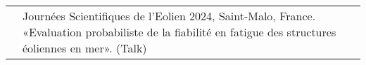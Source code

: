 \begin{center}
\begin{tabularx}{\textwidth}{c X}
                    & Journées Scientifiques de l’Eolien 2024, Saint-Malo, France. «Evaluation probabiliste de la fiabilité en fatigue des structures éoliennes en mer». (Talk)
                    
        \end{tabularx}    
\end{center}